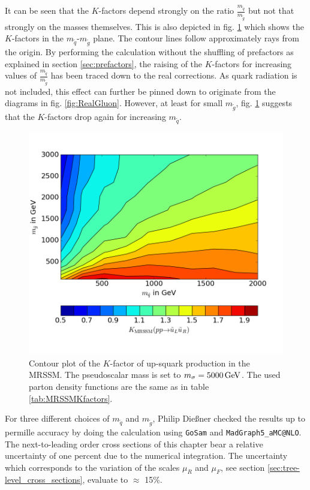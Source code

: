 It can be seen that the $K$-factors depend strongly on the ratio $\frac{m_{\tilde{q}}}{m_{\tilde{g}}}$ but not that strongly on the masses themselves. This is also depicted in fig. \ref{fig:Kfactor_MRSSM} which shows the $K$-factors in the $m_{\tilde{q}}$-$m_{\tilde{g}}$ plane. The contour lines follow approximately rays from the origin. By performing the calculation without the shuffling of prefactors as explained in section \ref{sec:prefactors}, the raising of the $K$-factors for increasing values of $\frac{m_{\tilde{q}}}{m_{\tilde{g}}}$ has been traced down to the real corrections. As quark radiation is not included, this effect can further be pinned down to originate from the diagrams in fig. \ref{fig:RealGluon}. However, at least for small $m_{\tilde{g}}$, fig. \ref{fig:Kfactor_MRSSM} suggests that the $K$-factors drop again for increasing $m_{\tilde{q}}$.
\begin{figure}[H]
\begin{center}
\includegraphics[scale=.6]{figures/Kfactor_MRSSM.png}
\caption{Contour plot of the $K$-factor of up-squark production in the MRSSM. The pseudoscalar mass is set to $m_{\sigma} = \unit[5000]{GeV}$. The used parton density functions are the same as in table \ref{tab:MRSSMKfactors}.}\label{fig:Kfactor_MRSSM}
\end{center}
\end{figure}
For three different choices of $m_{\tilde{q}}$ and $m_{\tilde{g}}$, Philip Dießner checked the results up to permille accuracy by doing the calculation using \texttt{GoSam}\cite{Cullen:2014yla, Cullen:2011ac} and \texttt{MadGraph5\_aMC@NLO}\cite{Alwall:2014hca}.\\
The next-to-leading order cross sections of this chapter bear a relative uncertainty of one percent due to the numerical integration. The uncertainty which corresponds to the variation of the scales $\mu_R$ and $\mu_F$, see section \ref{sec:tree-level_cross_sections},  evaluate to $\approx$ 15\%.


